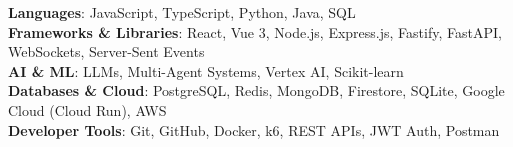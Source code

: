 \begin{itemize}[leftmargin=0.15in, label={}]
    \small{\item{
     \textbf{Languages}{: JavaScript, TypeScript, Python, Java, SQL} \\
     \textbf{Frameworks \& Libraries}{: React, Vue 3, Node.js, Express.js, Fastify, FastAPI, WebSockets, Server-Sent Events} \\
     \textbf{AI \& ML}{: LLMs, Multi-Agent Systems, Vertex AI, Scikit-learn} \\
     \textbf{Databases \& Cloud}{: PostgreSQL, Redis, MongoDB, Firestore, SQLite, Google Cloud (Cloud Run), AWS} \\
     \textbf{Developer Tools}{: Git, GitHub, Docker, k6, REST APIs, JWT Auth, Postman}
    }}
\end{itemize}

